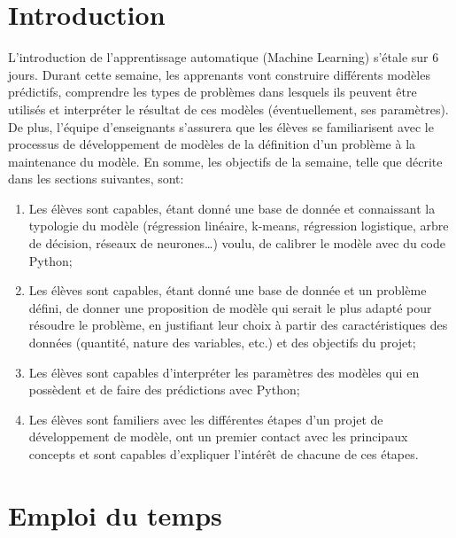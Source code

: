 \documentclass[12pt,a4paper]{article}
\begin{document}
\section{Introduction}

L’introduction de l’apprentissage automatique (Machine Learning) s’étale sur 6 jours. Durant cette semaine, les apprenants vont construire différents modèles prédictifs, comprendre les types de problèmes dans lesquels ils peuvent être utilisés et interpréter le résultat de ces modèles (éventuellement, ses paramètres).
De plus, l’équipe d’enseignants s’assurera que les élèves se familiarisent avec le processus de développement de modèles de la définition d’un problème à la maintenance du modèle.
En somme, les objectifs de la semaine, telle que décrite dans les sections suivantes, sont:
\begin{enumerate}
\item Les élèves sont capables, étant donné une base de donnée et connaissant la typologie du modèle (régression linéaire, k-means, régression logistique, arbre de décision, réseaux de neurones\dots{}) voulu, de calibrer le modèle avec du code Python;

\item Les élèves sont capables, étant donné une base de donnée et un problème défini, de donner une proposition de modèle qui serait le plus adapté pour résoudre le problème, en justifiant leur choix à partir des caractéristiques des données (quantité, nature des variables, etc.) et des objectifs du projet;

\item Les élèves sont capables d'interpréter les paramètres des modèles qui en possèdent et de faire des prédictions avec Python;

\item Les élèves sont familiers avec les différentes étapes d’un projet de développement de modèle, ont un premier contact avec les principaux concepts et sont capables d’expliquer l’intérêt de chacune de ces étapes.
\end{enumerate}

\section{Emploi du temps}
\end{document}

